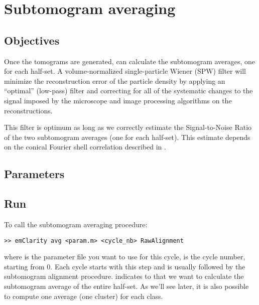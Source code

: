 \section{Subtomogram averaging} \label{sec:avg}

\subsection{Objectives}

Once the tomograms are generated, {\emClarity} can calculate the subtomogram averages, one for each half-set. A volume-normalized single-particle Wiener (SPW) filter \cite{volume_normalized_SPW} will minimize the reconstruction error of the particle density by applying an ``optimal'' (low-pass) filter and correcting for all of the systematic changes to the signal imposed by the microscope and image processing algorithms on the reconstructions.

\begin{note}This filter is optimum as long as we correctly estimate the Signal-to-Noise Ratio of the two subtomogram averages (one for each half-set). This estimate depends on the conical Fourier shell correlation described in .
\end{note}

\subsection{Parameters}



\subsection{Run}

To call the subtomogram averaging procedure:
\begin{lstlisting}
>> emClarity avg <param.m> <cycle_nb> RawAlignment
\end{lstlisting}

where  is the parameter file you want to use for this cycle,  is the cycle number, starting from 0. Each cycle starts with this step and is usually followed by the subtomogram alignment procedure.  indicates to {\emClarity} that we want to calculate the subtomogram average of the entire half-set. As we'll see later, it is also possible to compute one average (one cluster) for each class.

